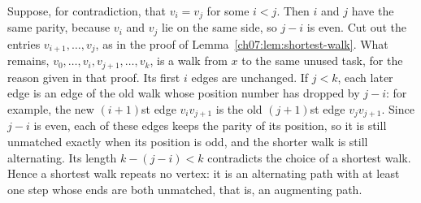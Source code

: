 {Suppose, for contradiction, that $v_i=v_j$ for some $i<j$. Then $i$ and $j$ have the same parity, because $v_i$ and $v_j$ lie on the same side, so $j-i$ is even. Cut out the entries $v_{i+1},\ldots,v_j$, as in the proof of Lemma~\ref{ch07:lem:shortest-walk}. What remains, $v_0,\ldots,v_i,v_{j+1},\ldots,v_k$, is a walk from $x$ to the same unused task, for the reason given in that proof. Its first $i$ edges are unchanged. If $j<k$, each later edge is an edge of the old walk whose position number has dropped by $j-i$: for example, the new $(i+1)$st edge $v_iv_{j+1}$ is the old $(j+1)$st edge $v_jv_{j+1}$. Since $j-i$ is even, each of these edges keeps the parity of its position, so it is still unmatched exactly when its position is odd, and the shorter walk is still alternating. Its length $k-(j-i)<k$ contradicts the choice of a shortest walk. Hence a shortest walk repeats no vertex: it is an alternating path with at least one step whose ends are both unmatched, that is, an augmenting path.}
